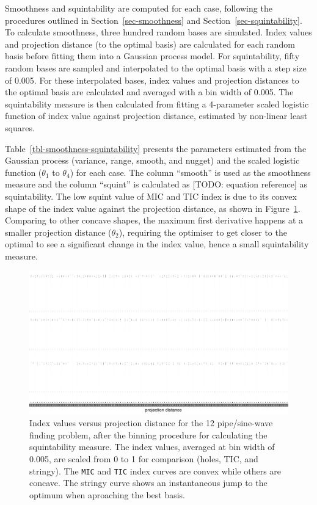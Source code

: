 \documentclass[
  number,
  preprint,
  3p]{elsarticle}
\begin{document}
Smoothness and squintability are computed for each case, following the
procedures outlined in Section~\ref{sec-smoothness} and
Section~\ref{sec-squintability}. To calculate smoothness, three hundred
random bases are simulated. Index values and projection distance (to the
optimal basis) are calculated for each random basis before fitting them
into a Gaussian process model. For squintability, fifty random bases are
sampled and interpolated to the optimal basis with a step size of 0.005.
For these interpolated bases, index values and projection distances to
the optimal basis are calculated and averaged with a bin width of 0.005.
The squintability measure is then calculated from fitting a 4-parameter
scaled logistic function of index value against projection distance,
estimated by non-linear least squares.

Table~\ref{tbl-smoothness-squintability} presents the parameters
estimated from the Gaussian process (variance, range, smooth, and
nugget) and the scaled logistic function (\(\theta_1\) to \(\theta_4\))
for each case. The column ``smooth'' is used as the smoothness measure
and the column ``squint'' is calculated as {[}TODO: equation
reference{]} as squintability. The low squint value of MIC and TIC index
is due to its convex shape of the index value against the projection
distance, as shown in Figure~\ref{fig-idx-proj-dist}. Comparing to other
concave shapes, the maximum first derivative happens at a smaller
projection distance (\(\theta_2\)), requiring the optimiser to get
closer to the optimal to see a significant change in the index value,
hence a small squintability measure.

\begin{figure}

{\centering \includegraphics{optim_files/figure-pdf/fig-idx-proj-dist-1.pdf}

}

\caption{\label{fig-idx-proj-dist}Index values versus projection
distance for the 12 pipe/sine-wave finding problem, after the binning
procedure for calculating the squintability measure. The index values,
averaged at bin width of 0.005, are scaled from 0 to 1 for comparison
(holes, TIC, and stringy). The \texttt{MIC} and \texttt{TIC} index
curves are convex while others are concave. The stringy curve shows an
instantaneous jump to the optimum when aproaching the best basis.}

\end{figure}
\end{document}

